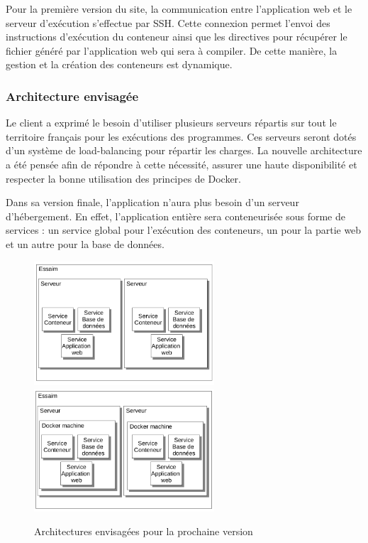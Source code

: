 \par Pour la première version du site, la communication entre l’application web et le serveur d'exécution s’effectue par SSH. Cette connexion permet l'envoi des instructions d'exécution du conteneur ainsi que les directives pour récupérer le fichier généré par l’application web qui sera à compiler. De cette manière, la gestion et la création des conteneurs est dynamique.

\subsubsection{Architecture envisagée}

\par Le client a exprimé le besoin d'utiliser plusieurs serveurs répartis sur tout le territoire français pour les exécutions des programmes. Ces serveurs seront dotés d'un système de load-balancing pour répartir les charges.
La nouvelle architecture a été pensée afin de répondre à cette nécessité, assurer une haute disponibilité et respecter la bonne utilisation des principes de Docker.

\par Dans sa version finale, l’application n’aura plus besoin d’un serveur d’hébergement. En effet, l’application entière sera conteneurisée sous forme de services : un service global pour l’exécution des conteneurs, un pour la partie web et un autre pour la base de données.

\begin{figure}[H]
\centering
\includegraphics[width=0.6\textwidth]{./img/backend/architectureenvisagee1.png}
\includegraphics[width=0.6\textwidth]{./img/backend/architectureenvisagee2.png}
\caption{Architectures envisagées pour la prochaine version}
\end{figure}

